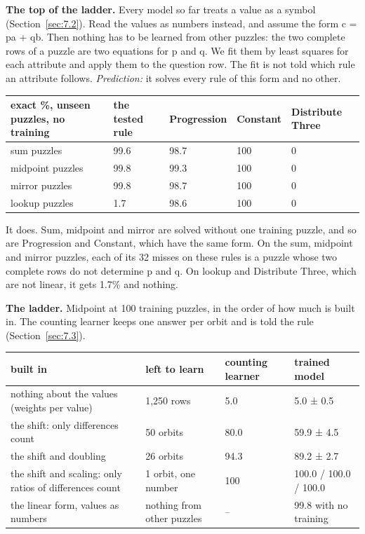 \textbf{The top of the ladder.} Every model so far treats a value as a symbol (Section~\ref{sec:7.2}). Read the values as numbers instead, and assume the form c = pa + qb. Then nothing has to be learned from other puzzles: the two complete rows of a puzzle are two equations for p and q. We fit them by least squares for each attribute and apply them to the question row. The fit is not told which rule an attribute follows. \emph{Prediction:} it solves every rule of this form and no other.

\begin{center}\small
\begin{tabularx}{\linewidth}{@{}Yllll@{}}
\toprule
exact \%, unseen puzzles, no training & the tested rule & Progression & Constant & Distribute Three \\
\midrule
sum puzzles & 99.6 & 98.7 & 100 & 0 \\
midpoint puzzles & 99.8 & 99.3 & 100 & 0 \\
mirror puzzles & 99.8 & 98.7 & 100 & 0 \\
lookup puzzles & 1.7 & 98.6 & 100 & 0 \\
\bottomrule
\end{tabularx}
\end{center}

It does. Sum, midpoint and mirror are solved without one training puzzle, and so are Progression and Constant, which have the same form. On the sum, midpoint and mirror puzzles, each of its 32 misses on these rules is a puzzle whose two complete rows do not determine p and q. On lookup and Distribute Three, which are not linear, it gets 1.7\% and nothing.

\textbf{The ladder.} Midpoint at 100 training puzzles, in the order of how much is built in. The counting learner keeps one answer per orbit and is told the rule (Section~\ref{sec:7.3}).

\begin{center}\small
\begin{tabularx}{\linewidth}{@{}YYlY@{}}
\toprule
built in & left to learn & counting learner & trained model \\
\midrule
nothing about the values (weights per value) & 1,250 rows & 5.0 & 5.0 ± 0.5 \\
the shift: only differences count & 50 orbits & 80.0 & 59.9 ± 4.5 \\
the shift and doubling & 26 orbits & 94.3 & 89.2 ± 2.7 \\
the shift and scaling: only ratios of differences count & 1 orbit, one number & 100 & 100.0 / 100.0 / 100.0 \\
the linear form, values as numbers & nothing from other puzzles & – & 99.8 with no training \\
\bottomrule
\end{tabularx}
\end{center}

